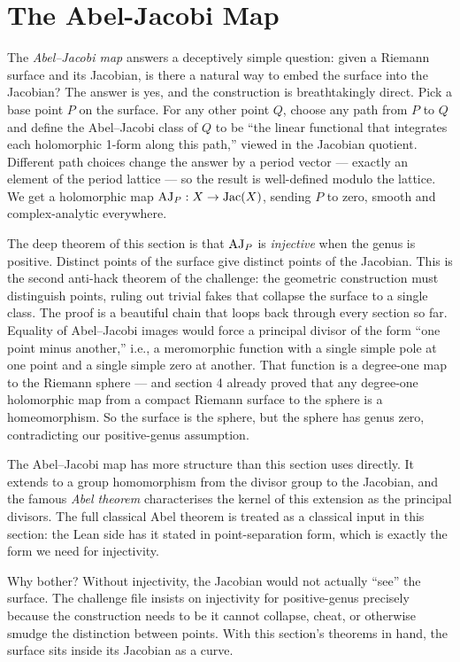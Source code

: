 \section{The Abel-Jacobi Map}
\label{sec:abel-jacobi}

\begin{layman}
The \emph{Abel--Jacobi map} answers a deceptively simple question:
given a Riemann surface and its Jacobian, is there a natural way to
embed the surface into the Jacobian? The answer is yes, and the
construction is breathtakingly direct. Pick a base point \(P\) on
the surface. For any other point \(Q\), choose any path from \(P\)
to \(Q\) and define the Abel--Jacobi class of \(Q\) to be ``the
linear functional that integrates each holomorphic 1-form along
this path,'' viewed in the Jacobian quotient. Different path
choices change the answer by a period vector --- exactly an element
of the period lattice --- so the result is well-defined modulo the
lattice. We get a holomorphic map
\(\operatorname{AJ}_P : X \to \operatorname{Jac}(X)\),
sending \(P\) to zero, smooth and complex-analytic everywhere.

The deep theorem of this section is that \(\operatorname{AJ}_P\) is
\emph{injective} when the genus is positive. Distinct points of the
surface give distinct points of the Jacobian. This is the second
anti-hack theorem of the challenge: the geometric
construction must distinguish points, ruling out trivial fakes that
collapse the surface to a single class. The proof is a beautiful
chain that loops back through every section so far. Equality of
Abel--Jacobi images would force a principal divisor of the form
``one point minus another,'' i.e., a meromorphic function with a
single simple pole at one point and a single simple zero at another.
That function is a degree-one map to the Riemann sphere --- and
section 4 already proved that any degree-one holomorphic map from a
compact Riemann surface to the sphere is a homeomorphism. So the
surface is the sphere, but the sphere has genus zero, contradicting
our positive-genus assumption.

The Abel--Jacobi map has more structure than this section uses
directly. It extends to a group homomorphism from the divisor group
to the Jacobian, and the famous \emph{Abel theorem} characterises
the kernel of this extension as the principal divisors. The full
classical Abel theorem is treated as a classical input in this
section: the Lean side has it stated in point-separation form,
which is exactly the form we need for injectivity.

Why bother? Without injectivity, the Jacobian would not actually
``see'' the surface. The challenge file insists on injectivity for
positive-genus precisely because the construction needs to be
it cannot collapse, cheat, or otherwise smudge the
distinction between points. With this section's theorems in hand,
the surface sits inside its Jacobian as a curve.
\end{layman}

